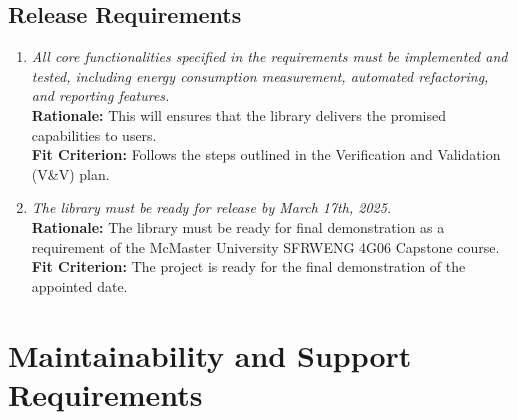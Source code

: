 \documentclass[12pt]{article}
\begin{document}
\subsection{Release Requirements}
\begin{enumerate}[label=OER-RL \arabic*., wide=0pt, leftmargin=*]
	\item \emph{All core functionalities specified in the requirements must be implemented and tested, including energy consumption measurement, automated refactoring, and reporting features.}\\[2mm]
    {\bf Rationale:} This will ensures that the library delivers the promised capabilities to users.\\
    {\bf Fit Criterion:} Follows the steps outlined in the Verification and Validation (V\&V) plan.  
  \item \emph{The library must be ready for release by March 17th, 2025.}\\[2mm]
    {\bf Rationale:} The library must be ready for final demonstration as a requirement of the McMaster University SFRWENG 4G06 Capstone course.\\
    {\bf Fit Criterion:} The project is ready for the final demonstration of the appointed date.
\end{enumerate}

\section{Maintainability and Support Requirements}
\end{document}
